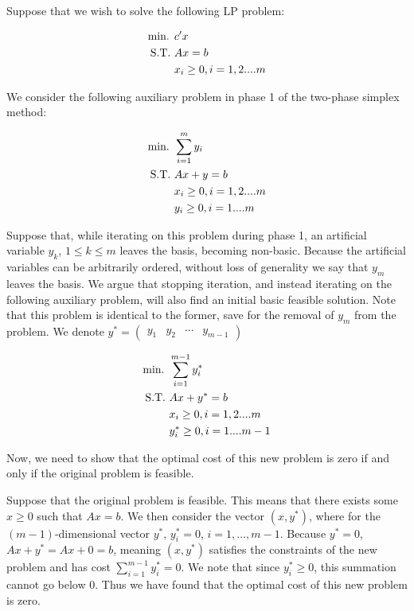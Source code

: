 Suppose that we wish to solve the following LP problem:

\begin{align}
    \text{min. } &c'x \notag\\
    \text{S.T. } &Ax = b \notag\\
    &x_i \ge 0, i = 1,2....m \notag\\
\end{align}

We consider the following auxiliary problem in phase 1 of the two-phase simplex method:

\begin{align}
    \text{min. } &\sum_{i=1}^{m}y_i \notag\\
    \text{S.T. } &Ax + y = b \notag\\
    &x_i \ge 0, i = 1,2....m \notag\\
    &y_i \ge 0, i = 1....m \notag\\
\end{align}

Suppose that, while iterating on this problem during phase 1, an artificial variable $y_k$, $1\leq k\leq m$ leaves the basis, becoming non-basic. Because the artificial variables can be arbitrarily ordered, without loss of generality we say that $y_m$ leaves the basis. We argue that stopping iteration, and instead iterating on the following auxiliary problem, will also find an initial basic feasible solution. Note that this problem is identical to the former, save for the removal of $y_m$ from the problem. We denote $y^*=\begin{pmatrix}y_1 & y_2 & \cdots & y_{m-1}\end{pmatrix}$

\begin{align}
    \text{min. } &\sum_{i=1}^{m-1}y_i^* \notag\\
    \text{S.T. } &Ax + y^* = b \notag\\
    &x_i \ge 0, i = 1,2....m \notag\\
    &y_i^* \ge 0, i = 1....m-1 \notag\\
\end{align}

Now, we need to show that the optimal cost of this new problem is zero if and only if the original problem is feasible. 

Suppose that the original problem is feasible. This means that there exists some $x\geq0$ such that $Ax=b$. We then consider the vector $(x,y^*)$, where for the $(m-1)$-dimensional vector $y^*$, $y_i^*=0$, $i=1, ..., m-1$. Because $y^*=0$, $Ax+y^*=Ax+0=b$, meaning $(x,y^*)$ satisfies the constraints of the new problem and has cost $\sum_{i=1}^{m-1}y_i^*=0$. We note that since $y_i^*\geq 0$, this summation cannot go below $0$. Thus we have found that the optimal cost of this new problem is zero.

